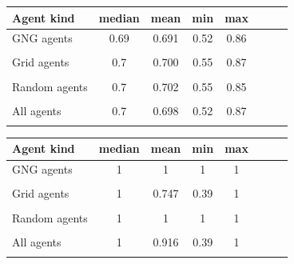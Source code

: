 \begin{center}
  \begin{tabular}{l*{6}{c}r}
  Agent kind        & median & mean & min & max \\
  \hline
  GNG agents        & 0.69                  & 0.691                   & 0.52                  & 0.86  \\
                    & \color{red}{-0.01}  & \color{red}{-0.008}   & \color{red}{-0.05}  &       \\
  Grid agents       & 0.7                   & 0.700                   & 0.55                  & 0.87   \\   
                    &                       & \color{green}{+0.003} & \color{green}{+0.01}& \color{green}{+0.04} \\
  Random agents     & 0.7                   & 0.702                   & 0.55                  & 0.85   \\
                    &                       & \color{red}{-0.002}   & \color{red}{-0.02}  & \color{red}{-0.02}  \\
  All agents        & 0.7                   & 0.698                   & 0.52                  & 0.87  \\
                    &                       &                         & \color{red}{-0.02}  &       \\
  \end{tabular}                                
\end{center}

\begin{center} 
  \begin{tabular}{l*{6}{c}r}
  Agent kind        & median & mean & min & max \\
  \hline
  GNG agents        & 1 & 1 & 1 & 1  \\
                    &   \\
  Grid agents       & 1                     & 0.747                 & 0.39                & 1  \\  
                    & \color{green}{+0.39}  & \color{green}{0.026}  & \color{red}{-0.08}  \\
  Random agents     & 1 & 1 & 1 & 1  \\         
                    & \\
  All agents        & 1 & 0.916                 & 0.39 & 1  \\  
                    &   & \color{green}{+0.092}  & \color{red}{-0.05} \\
  \end{tabular}                                        
\end{center}

